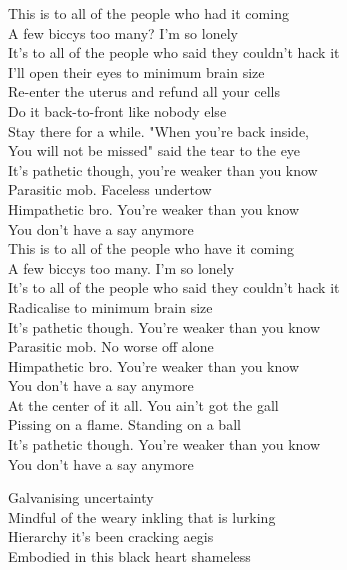 This is to all of the people who had it coming \\
A few biccys too many? I'm so lonely \\
It's to all of the people who said they couldn't hack it \\
I'll open their eyes to minimum brain size \\

Re-enter the uterus and refund all your cells \\
Do it back-to-front like nobody else \\
Stay there for a while. "When you're back inside, \\
You will not be missed" said the tear to the eye \\

It's pathetic though, you're weaker than you know \\
Parasitic mob. Faceless undertow \\
Himpathetic bro. You're weaker than you know \\
You don't have a say anymore \\

This is to all of the people who have it coming \\
A few biccys too many. I'm so lonely \\
It's to all of the people who said they couldn't hack it \\
Radicalise to minimum brain size \\

It's pathetic though. You're weaker than you know \\
Parasitic mob. No worse off alone \\
Himpathetic bro. You're weaker than you know \\
You don't have a say anymore \\

At the center of it all. You ain't got the gall \\
Pissing on a flame. Standing on a ball \\
It's pathetic though. You're weaker than you know \\
You don't have a say anymore \\




Galvanising uncertainty \\
Mindful of the weary inkling that is lurking \\
Hierarchy it's been cracking aegis \\
Embodied in this black heart shameless \\

